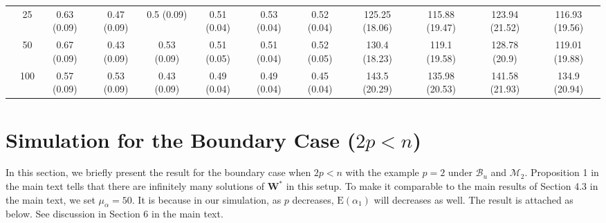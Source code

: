 \documentclass[11pt]{article}
\def\mbf#1{\mathbf{#1}} %
\def\mc#1{\mathcal{#1}} %
\def\E#1{\mathrm{E}(#1)} %
\theoremstyle{definition}
\begin{document}
\begin{table}[H]
\begin{center}
{\begin{tabular}{cc|ccc|ccc|cccc|}
  & 25  & 0.63 (0.09) & 0.47 (0.09) & 0.5 (0.09) & 0.51 (0.04) & 0.53 (0.04) & 0.52 (0.04) & 125.25 (18.06) & 115.88 (19.47) & 123.94 (21.52) & 116.93 (19.56) \\ 
  & 50  & 0.67 (0.09) & 0.43 (0.09) & 0.53 (0.09) & 0.51 (0.05) & 0.51 (0.04) & 0.52 (0.05) & 130.4 (18.23) & 119.1 (19.58) & 128.78 (20.9) & 119.01 (19.88) \\ 
  & 100  & 0.57 (0.09) & 0.53 (0.09) & 0.43 (0.09) & 0.49 (0.04) & 0.49 (0.04) & 0.45 (0.04) & 143.5 (20.29) & 135.98 (20.53) & 141.58 (21.93) & 134.9 (20.94) \\ 
\end{tabular}}
   \end{center}
      \vspace{-.5cm}
\end{table}

\section{Simulation for the Boundary Case ($2p < n$)}

\label{boundary}

In this section, we briefly present the result for the boundary case when $2p < n$ with the example $p = 2$ under $\mc{B}_u$ and $\mc{M}_2$. Proposition 1 in the main text tells that there are infinitely many solutions of $\mbf{W}^*$ in this setup. To make it comparable to the main results of Section 4.3 in the main text, we set $\mu_{\alpha}=50$. It is because in our simulation, as $p$ decreases, $\E{\alpha_1}$ will decreases as well. The result is attached as below. See discussion in Section 6 in the main text.
\end{document}
